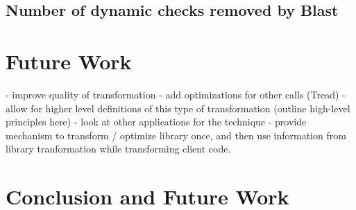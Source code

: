 \documentclass[10pt,letterpaper,twocolumn,english]{article}
\begin{document}
\subsection{Number of dynamic checks removed by Blast}

\section{Future Work}
 - improve quality of transformation
 - add optimizations for other calls (Tread)
 - allow for higher level definitions of this type of transformation (outline high-level principles here)
 - look at other applications for the technique
 - provide mechanism to transform / optimize library once, and then use information from library tranformation while transforming client code.
\section{Conclusion and Future Work}
\end{document}
